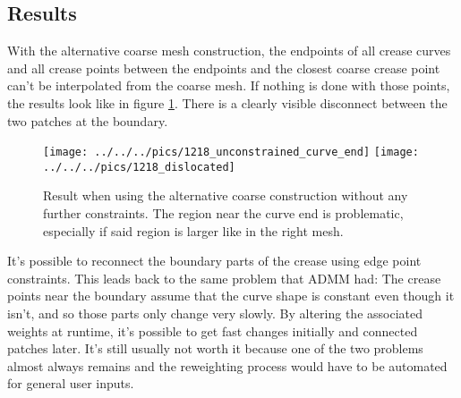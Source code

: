 \documentclass[a4paper,twoside,12pt,nochapterprefix]{scrbook}
\begin{document}
\subsection{Results}
With the alternative coarse mesh construction, the endpoints of all crease curves and all crease points between the endpoints and the closest coarse crease point can't be interpolated from the coarse mesh. If nothing is done with those points, the results look like in figure \ref{fig:alt_coarse_result}. There is a clearly visible disconnect between the two patches at the boundary.\newline
\begin{figure}
    \centering
    \texttt{[image: ../../../pics/1218\_unconstrained\_curve\_end]}
    \texttt{[image: ../../../pics/1218\_dislocated]}
    \caption{Result when using the alternative coarse construction without any further constraints. The region near the curve end is problematic, especially if said region is larger like in the right mesh.}
      \label{fig:alt_coarse_result}
\end{figure}
It's possible to reconnect the boundary parts of the crease using edge point constraints. This leads back to the same problem that ADMM had: The crease points near the boundary assume that the curve shape is constant even though it isn't, and so those parts only change very slowly. By altering the associated weights at runtime, it's possible to get fast changes initially and connected patches later. It's still usually not worth it because one of the two problems almost always remains and the reweighting process would have to be automated for general user inputs.\newline
\end{document}
